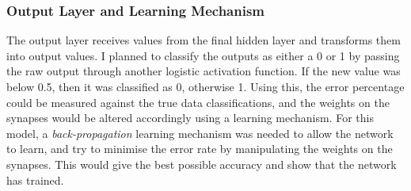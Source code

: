 \documentclass[11pt]{article}
\begin{document}
\subsubsection{Output Layer and Learning Mechanism}\label{subsubsec:output}
The output layer receives values from the final hidden layer and transforms them into output values. I planned to classify the outputs as either a 0 or 1 by passing the raw output through another logistic activation function. If the new value was below 0.5, then it was classified as 0, otherwise 1. Using this, the error percentage could be measured against the true data classifications, and the weights on the synapses would be altered accordingly using a learning mechanism. For this model, a \textit{back-propagation} learning mechanism was needed to allow the network to learn, and try to minimise the error rate by manipulating the weights on the synapses. This would give the best possible accuracy and show that the network has trained.
\end{document}
